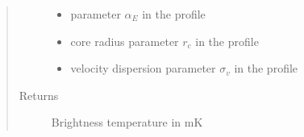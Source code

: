 \documentclass[letterpaper,10pt,english]{sphinxmanual}
\begin{document}
\begin{fulllineitems}
\begin{quote}
\begin{description}
\begin{itemize}
\item {} 
\sphinxAtStartPar
{} \textendash{} parameter \(\alpha_E\) in the {\hyperref[\detokenize{diffsph.profiles:diffsph.profiles.templates.enst}]{}} profile

\item {} 
\sphinxAtStartPar
{} \textendash{} core radius parameter \(r_c\) in the {\hyperref[\detokenize{diffsph.profiles:diffsph.profiles.templates.cnfw}]{}} profile

\item {} 
\sphinxAtStartPar
{} \textendash{} velocity dispersion parameter \(\sigma_v\) in the {\hyperref[\detokenize{diffsph.profiles:diffsph.profiles.templates.sis}]{}} profile

\end{itemize}

\item[{Returns}] \leavevmode
\sphinxAtStartPar
Brightness temperature in mK

\end{description}\end{quote}

\end{fulllineitems}

\end{document}
